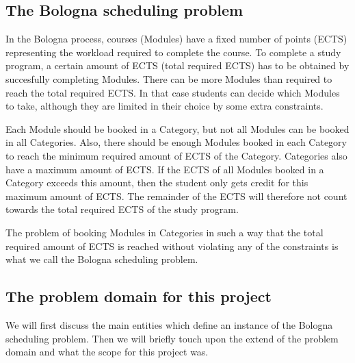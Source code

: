 \documentclass[a4paper]{article}
\begin{document}

\subsection{The Bologna scheduling problem}
In the Bologna process, courses (Modules) have a fixed number of points (ECTS) representing the workload required to complete the course.
To complete a study program, a certain amount of ECTS (total required ECTS) has to be obtained by succesfully completing Modules.
There can be more Modules than required to reach the total required ECTS.
In that case students can decide which Modules to take, although they are limited in their choice by some extra constraints.

Each Module should be booked in a Category, but not all Modules can be booked in all Categories.
Also, there should be enough Modules booked in each Category to reach the minimum required amount of ECTS of the Category.
Categories also have a maximum amount of ECTS.
If the ECTS of all Modules booked in a Category exceeds this amount, then the student only gets credit for this maximum amount of ECTS.
The remainder of the ECTS will therefore not count towards the total required ECTS of the study program.

The problem of booking Modules in Categories in such a way that the total required amount of ECTS is reached without violating any of the constraints is what we call the Bologna scheduling problem.


\subsection{The problem domain for this project}
We will first discuss the main entities which define an instance of the Bologna scheduling problem.
Then we will briefly touch upon the extend of the problem domain and what the scope for this project was.

\end{document}
